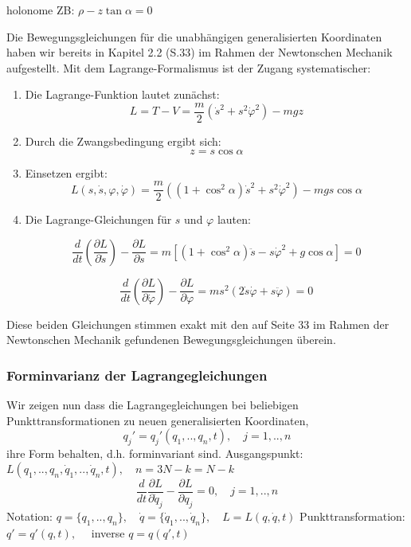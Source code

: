 \documentclass[10pt, letterpaper]{article}
\begin{document}
holonome ZB: $\rho-z\tan\alpha=0$

Die Bewegungsgleichungen für die unabhängigen generalisierten Koordinaten haben wir bereits in Kapitel 2.2 (S.33) im Rahmen der Newtonschen Mechanik aufgestellt. Mit dem Lagrange-Formalismus ist der Zugang systematischer:
\begin{enumerate}
    \item Die Lagrange-Funktion lautet zunächst:
    \[
    L = T - V = \frac{m}{2} \left( \dot{s}^2 + s^2 \dot{\varphi}^2 \right) - mgz
    \]

    \item Durch die Zwangsbedingung ergibt sich:
    \[
    z = s \cos\alpha
    \]

    \item Einsetzen ergibt:
    \[
    L(s, \dot{s}, \varphi, \dot{\varphi}) 
    = \frac{m}{2} \left( (1 + \cos^2\alpha)\dot{s}^2 + s^2 \dot{\varphi}^2 \right) - mgs\cos\alpha
    \]

    \item Die Lagrange-Gleichungen für \( s \) und \( \varphi \) lauten:

    \[
    \frac{d}{dt} \left( \frac{\partial L}{\partial \dot{s}} \right) - \frac{\partial L}{\partial s}
    = m\left[(1 + \cos^2\alpha) \ddot{s} - s \dot{\varphi}^2 + g \cos\alpha\right] = 0
    \]

    \[
    \frac{d}{dt} \left( \frac{\partial L}{\partial \dot{\varphi}} \right) - \frac{\partial L}{\partial \varphi}
    = m s^2 \left( 2 \dot{s} \dot{\varphi} + s \ddot{\varphi} \right) = 0
    \]

\end{enumerate}

Diese beiden Gleichungen stimmen exakt mit den auf Seite 33 im Rahmen der Newtonschen Mechanik gefundenen Bewegungsgleichungen überein.


\pagebreak


\subsubsection{Forminvarianz der Lagrangegleichungen}

Wir zeigen nun dass die Lagrangegleichungen bei beliebigen Punkttransformationen zu neuen generalisierten Koordinaten,
$$q_j' = q_j'(q_1,..,q_n,t), \quad j=1,..,n$$
ihre Form behalten, d.h. forminvariant sind.
Ausgangspunkt: $L(q_1,..,q_n,\dot{q}_1,..,\dot{q}_n,t), \quad n=3N-k=N-k$
$$\dfrac{d}{dt}\dfrac{\partial L}{\partial \dot{q}_j} - \dfrac{\partial L}{\partial q_j} = 0, \quad j=1,..,n$$
Notation: $q=\{q_1,..,q_n\}, \quad \dot{q}=\{\dot{q}_1,..,\dot{q}_n\}, \quad L=L(q,\dot{q},t)$
Punkttransformation: $q'=q'(q,t), \quad$ inverse $q=q(q',t)$
\end{document}

